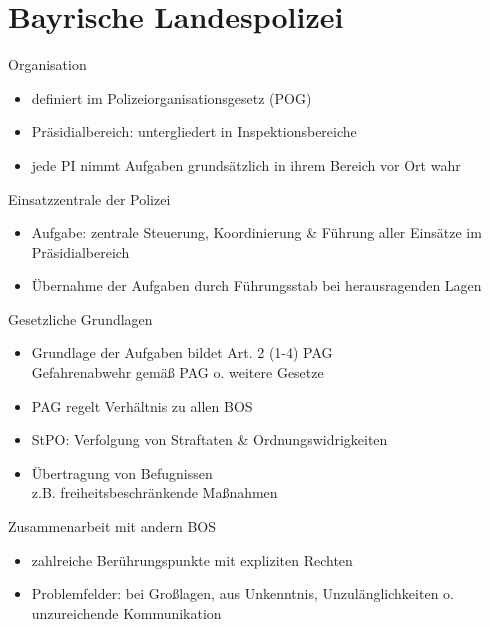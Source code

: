 \section{Bayrische Landespolizei}
\begin{sectionbox}{Organisation}
    \begin{itemize}
        \item definiert im Polizeiorganisationsgesetz (POG)
        \item Präsidialbereich: untergliedert in Inspektionsbereiche
        \item jede PI nimmt Aufgaben grundsätzlich in ihrem Bereich vor Ort wahr
    \end{itemize}
\end{sectionbox}
\begin{sectionbox}{Einsatzzentrale der Polizei}
    \begin{itemize}
        \item Aufgabe: zentrale Steuerung, Koordinierung \& Führung aller Einsätze im Präsidialbereich
        \item Übernahme der Aufgaben durch Führungsstab bei herausragenden Lagen
    \end{itemize}
\end{sectionbox}
\begin{sectionbox}{Gesetzliche Grundlagen}
    \begin{itemize}
        \item Grundlage der Aufgaben bildet Art. 2 (1-4) PAG\\
        \ra Gefahrenabwehr gemäß PAG o. weitere Gesetze
        \item PAG regelt Verhältnis zu allen BOS
        \item StPO: Verfolgung von Straftaten \& Ordnungswidrigkeiten
        \item Übertragung von Befugnissen\\
        \ra z.B. freiheitsbeschränkende Maßnahmen
    \end{itemize}
\end{sectionbox}
\begin{sectionbox}{Zusammenarbeit mit andern BOS}
    \begin{itemize}
        \item zahlreiche Berührungspunkte mit expliziten Rechten
        \item Problemfelder: bei Großlagen, aus Unkenntnis, Unzulänglichkeiten o. unzureichende Kommunikation
    \end{itemize}
\end{sectionbox}